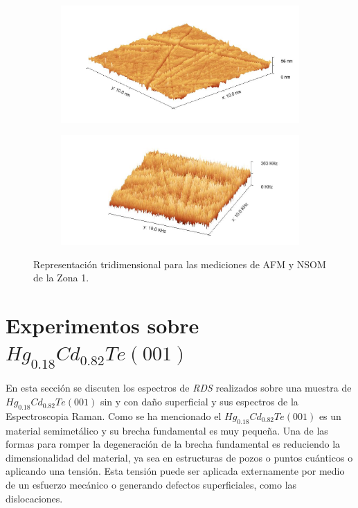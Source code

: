 \begin{figure}[h!]
    \centering
    \begin{subfigure}[b]{0.5\textwidth}
        \centering
        \includegraphics[width = 1\textwidth]{figures/chap4/CdTe_Ag_10um-3d.jpg}
    \end{subfigure}\hfill
    \begin{subfigure}[b]{0.5\textwidth}
        \centering
        \includegraphics[width = 1\textwidth]{figures/chap4/CdTe_Ag_10um-3d-nsom.jpg}
    \end{subfigure}

\caption{Representación tridimensional para las mediciones de AFM y NSOM de la Zona 1.}
\label{fig:afm-nsom-results-3d}
\end{figure}
\newpage

\section{Experimentos sobre $ Hg_{0.18}Cd_{0.82}Te (001)$}
\label{sec:chap4-hgcdte}
En esta sección se discuten los espectros de \textit{RDS} realizados sobre una muestra de $ Hg_{0.18}Cd_{0.82}Te (001)$ 
sin y con daño superficial y sus espectros de la Espectroscopia Raman. Como se ha mencionado el 
$ Hg_{0.18}Cd_{0.82}Te (001)$ es un material semimetálico y su brecha fundamental es muy pequeña. Una de las formas para 
romper la degeneración de la brecha fundamental es reduciendo la dimensionalidad del material, ya sea en estructuras de 
pozos o puntos cuánticos o aplicando una tensión. Esta tensión puede ser aplicada externamente por medio de un esfuerzo 
mecánico o generando defectos superficiales, como las dislocaciones.

